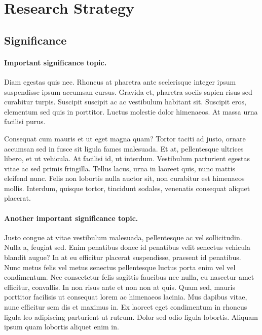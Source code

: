 \documentclass[11pt,]{article}
\title{}
\author{}
\date{}
\let\oldparagraph\paragraph
\renewcommand{\paragraph}[1]{\oldparagraph{#1}\mbox{}}
\begin{document}
\hypertarget{research-strategy}{%
\section{Research Strategy}\label{research-strategy}}

\hypertarget{significance}{%
\subsection{Significance}\label{significance}}

\hypertarget{important-significance-topic.}{%
\paragraph{Important significance
topic.}\label{important-significance-topic.}}

Diam egestas quis nec. Rhoncus at pharetra ante scelerisque integer
ipsum suspendisse ipsum accumsan cursus. Gravida et, pharetra sociis
sapien risus sed curabitur turpis. Suscipit suscipit ac ac vestibulum
habitant sit. Suscipit eros, elementum sed quis in porttitor. Luctus
molestie dolor himenaeos. At massa urna facilisi purus.

Consequat cum mauris et ut eget magna quam? Tortor taciti ad justo,
ornare accumsan sed in fusce sit ligula fames malesuada. Et at,
pellentesque ultrices libero, et ut vehicula. At facilisi id, ut
interdum. Vestibulum parturient egestas vitae ac sed primis fringilla.
Tellus lacus, urna in laoreet quis, nunc mattis eleifend nunc. Felis non
lobortis nulla auctor sit, non curabitur est himenaeos mollis. Interdum,
quisque tortor, tincidunt sodales, venenatis consequat aliquet placerat.

\hypertarget{another-important-significance-topic.}{%
\paragraph{Another important significance
topic.}\label{another-important-significance-topic.}}

Justo congue at vitae vestibulum malesuada, pellentesque ac vel
sollicitudin. Nulla a, feugiat sed. Enim penatibus donec id penatibus
velit senectus vehicula blandit augue? In at eu efficitur placerat
suspendisse, praesent id penatibus. Nunc metus felis vel metus senectus
pellentesque luctus porta enim vel vel condimentum. Nec consectetur
felis sagittis faucibus nec nulla, eu nascetur amet efficitur,
convallis. In non risus ante et non non at quis. Quam sed, mauris
porttitor facilisis ut consequat lorem ac himenaeos lacinia. Mus dapibus
vitae, nunc efficitur sem dis et maximus in. Ex laoreet eget condimentum
in rhoncus ligula leo adipiscing parturient ut rutrum. Dolor sed odio
ligula lobortis. Aliquam ipsum quam lobortis aliquet enim in.
\end{document}
